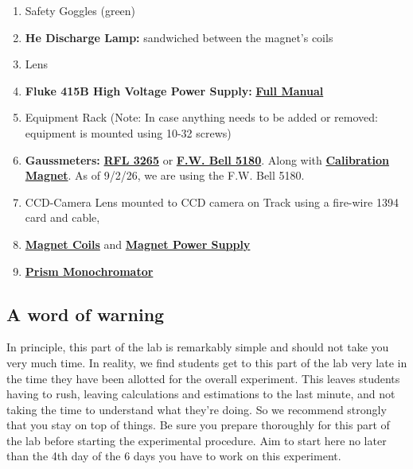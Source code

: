 \documentclass{../lab}
\begin{document}
\begin{enumerate}

    \item Safety Goggles (green)

    \item\textbf{He Discharge Lamp:} sandwiched between the magnet's coils

    \item Lens

    \item\textbf{Fluke 415B High Voltage Power Supply:}
    \href{https://drive.google.com/file/d/1YGXOdHOTArg7Lzzgi99meF589KtqvYfO/view?usp=drive_link}{\textbf{Full Manual}}

    \item Equipment Rack (Note: In case anything needs to be added or removed: equipment is mounted using 10-32 screws)

    \item\textbf{Gaussmeters:}
    \href{https://drive.google.com/file/d/1UcyUobfZyvBW115cSbkhLa44kAZA_p2D/view?usp=drive_link}{\textbf{RFL 3265}} or \href{https://drive.google.com/file/d/1hIz7hW4KIF7obkdW_PdeqojFywvVudIo/view?usp=drive_link}{\textbf{F.W. Bell 5180}}. Along with \href{https://drive.google.com/file/d/1PWmq7gfHy88IoJdNyBXNS1SrU7H9JxL6/view?usp=drive_link}{\textbf{Calibration Magnet}}. As of 9/2/26, we are using the F.W. Bell 5180.

    \item CCD-Camera Lens mounted to CCD camera on Track using a fire-wire 1394 card and cable,

    \item
    \href{https://drive.google.com/file/d/1ZEBcJwQs32g6hMcoBYsJanLmZSm7cnw8/view?usp=drive_link}{\textbf{Magnet Coils}} and \href{https://drive.google.com/file/d/1IxBFSkTWAH4IfESBu6vs2Xdw2-OM8rmA/view?usp=drive_link}{\textbf{Magnet Power Supply}}

    \item
    \href{https://drive.google.com/file/d/1JD_km8g82Zmd9BluuFtRRANng0q2LnmR/view?usp=drive_link}{\textbf{Prism Monochromator}}

\end{enumerate}

\subsection{A word of warning}

In principle, this part of the lab is remarkably simple and should not take you very much time. In reality, we find students get to this part of the lab very late in the time they have been allotted for the overall experiment. This leaves students having to rush, leaving calculations and estimations to the last minute, and not taking the time to understand what they're doing. So we recommend strongly that you stay on top of things. Be sure you prepare thoroughly for this part of the lab before starting the experimental procedure. Aim to start here no later than the 4th day of the 6 days you have to work on this experiment.
\end{document}
